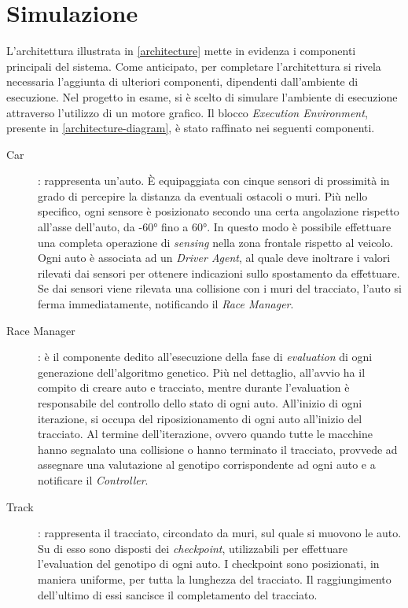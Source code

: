 \documentclass[a4paper,12pt]{article}
\begin{document}
\section{Simulazione} \label{simulation}
L'architettura illustrata in \autoref{architecture} mette in evidenza i componenti principali del sistema. Come anticipato, per completare l'architettura si rivela necessaria l'aggiunta di ulteriori componenti, dipendenti dall'ambiente di esecuzione. Nel progetto in esame, si è scelto di simulare l'ambiente di esecuzione attraverso l'utilizzo di un motore grafico. Il blocco \emph{Execution Environment}, presente in \autoref{architecture-diagram}, è stato raffinato nei seguenti componenti.
\begin{description}
	\item[Car]: rappresenta un'auto. È equipaggiata con cinque sensori di prossimità in grado di percepire la distanza da eventuali ostacoli o muri. Più nello specifico, ogni sensore è posizionato secondo una certa angolazione rispetto all'asse dell'auto, da \ang{-60} fino a \ang{+60}. In questo modo è possibile effettuare una completa operazione di \emph{sensing} nella zona frontale rispetto al veicolo. Ogni auto è associata ad un \emph{Driver Agent}, al quale deve inoltrare i valori rilevati dai sensori per ottenere indicazioni sullo spostamento da effettuare. Se dai sensori viene rilevata una collisione con i muri del tracciato, l'auto si ferma immediatamente, notificando il \emph{Race Manager}.
	\item[Race Manager]: è il componente dedito all'esecuzione della fase di \emph{evaluation} di ogni generazione dell'algoritmo genetico. Più nel dettaglio, all'avvio ha il compito di creare auto e tracciato, mentre durante l'evaluation è responsabile del controllo dello stato di ogni auto. All'inizio di ogni iterazione, si occupa del riposizionamento di ogni auto all'inizio del tracciato. Al termine dell'iterazione, ovvero quando tutte le macchine hanno segnalato una collisione o hanno terminato il tracciato, provvede ad assegnare una valutazione al genotipo corrispondente ad ogni auto e a notificare il \emph{Controller}.
	\item[Track]: rappresenta il tracciato, circondato da muri, sul quale si muovono le auto. Su di esso sono disposti dei \emph{checkpoint}, utilizzabili per effettuare l'evaluation del genotipo di ogni auto. I checkpoint sono posizionati, in maniera uniforme, per tutta la lunghezza del tracciato. Il raggiungimento dell'ultimo di essi sancisce il completamento del tracciato.
\end{description}
\end{document}
